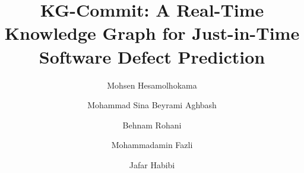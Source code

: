 \documentclass[final,5p,times,twocolumn]{elsarticle}
\theoremstyle{plain}
\begin{document}
\begin{frontmatter}



\title{KG-Commit: A Real-Time Knowledge Graph for Just-in-Time Software Defect Prediction}


\author[mce]{Mohsen Hesamolhokama}

\author[mce]{Mohammad Sina Beyrami Aghbash}

\author[math]{Behnam Rohani}

\author[mce]{Mohammadamin Fazli}

\author[mce]{Jafar Habibi}

\address[mce]{Department of Computer Engineering, Sharif University of Technology, Tehran, Iran}
\address[math]{Department of Mathematical Sciences, Sharif University of Technology, Tehran, Iran}



\end{frontmatter}
\end{document}
